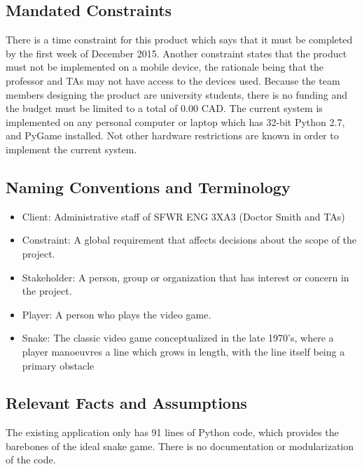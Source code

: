 \documentclass[12pt]{article}
\begin{document}
\subsection{Mandated Constraints}

There is a time constraint for this product which says that it must be completed by the first week of December 2015. Another constraint states that the product must not be implemented on a mobile device, the rationale being that the professor and TAs may not have access to the devices used. Because the team members designing the product are university students, there is no funding and the budget must be limited to a total of 0.00 CAD. The current system is implemented on any personal computer or laptop which has 32-bit Python 2.7, and PyGame installed. Not other hardware restrictions are known in order to implement the current system.

\subsection{Naming Conventions and Terminology}

\begin{itemize}

\item Client: Administrative staff of SFWR ENG 3XA3 (Doctor Smith and TAs)
		 	 	 						
\item Constraint: A global requirement that affects decisions about the scope of the project. 
\item Stakeholder: A person, group or organization that has interest or concern in the project.

\item Player: A person who plays the video game.

\item Snake: The classic video game conceptualized in the late 1970’s, where a player manoeuvres a line which grows in length, with the line itself being a primary obstacle
				
\end{itemize}

\subsection{Relevant Facts and Assumptions}

The existing application only has 91 lines of Python code, which provides the barebones of the ideal snake game. There is no documentation or modularization of the code.
\end{document}
